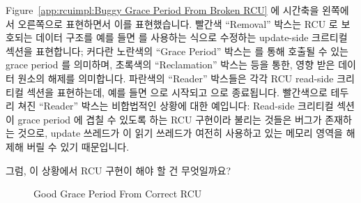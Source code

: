 Figure~\ref{app:rcuimpl:Buggy Grace Period From Broken RCU} 에 시간축을
왼쪽에서 오른쪽으로 표현하면서 이를 표현했습니다.
빨간색 ``Removal'' 박스는 RCU 로 보호되는 데이터 구조를 예를 들면
 를 사용하는 식으로 수정하는 update-side 크르티컬 섹션을
표현합니다; 커다란 노란색의 ``Grace Period'' 박스는  를
통해 호출될 수 있는 grace period 를 의미하며, 초록색의 ``Reclamation'' 박스는
 등을 통한, 영향 받은 데이터 원소의 해제를 의미합니다.
파란색의 ``Reader'' 박스들은 각각 RCU read-side 크리티컬 섹션을 표현하는데,
예를 들면  으로 시작되고  으로
종료됩니다.
빨간색으로 테두리 쳐진 ``Reader'' 박스는 비합법적인 상황에 대한 예입니다:
Read-side 크리티컬 섹션이 grace period 에 겹칠 수 있도록 하는 RCU 구현이라
불리는 것들은 버그가 존재하는 것으로, update 쓰레드가 이 읽기 쓰레드가 여전히
사용하고 있는 메모리 영역을 해제해 버릴 수 있기 때문입니다.

그럼, 이 상황에서 RCU 구현이 해야 할 건 무엇일까요?

\begin{figure}[htb]
\centering
{}
\caption{Good Grace Period From Correct RCU}
\label{app:rcuimpl:Good Grace Period From Correct RCU}
\end{figure}

